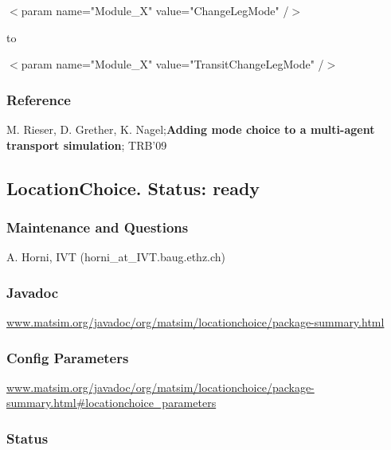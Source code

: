 \documentclass[a4paper,11pt]{report}
\begin{document}
$<$param name="Module\_X" value="ChangeLegMode" /$>$

to

$<$param name="Module\_X" value="TransitChangeLegMode" /$>$

\subsubsection{Reference}

M. Rieser, D. Grether, K. Nagel;\textbf{Adding mode choice to a multi-agent transport simulation}; TRB'09

\subsection{LocationChoice. Status: ready}

\subsubsection{\textbf{Maintenance and Questions}}

A. Horni, IVT (horni\_at\_IVT.baug.ethz.ch)

\subsubsection{\textbf{Javadoc}}

\href{http://www.matsim.org/javadoc/org/matsim/locationchoice/package-summary.html}{www.matsim.org/javadoc/org/matsim/locationchoice/package-summary.html}



\subsubsection{Config Parameters}


\href{http://www.matsim.org/javadoc/org/matsim/locationchoice/package-summary.html#locationchoice_parameters}{www.matsim.org/javadoc/org/matsim/locationchoice/package-summary.html\#locationchoice\_parameters}



\subsubsection{\textbf{Status}}
\end{document}
